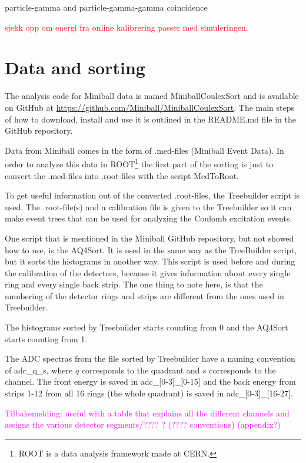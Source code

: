 \documentclass[twoside,english]{uiofysmaster/uiofysmaster}
\begin{document}
\bigskip

particle-gamma and particle-gamma-gamma coincidence

\textcolor{red}{sjekk opp om energi fra online kalibrering passer med simuleringen.}

\section{Data and sorting}
The analysis code for Miniball data is named MiniballCoulexSort and is available on GitHub at \url{https://github.com/Miniball/MiniballCoulexSort}. 
The main steps of how to download, install and use it is outlined in the README.md file in the GitHub repository. 

Data from Miniball comes in the form of .med-files (Miniball Event Data). 
In order to analyze this data in ROOT\footnote{ROOT is a data analysis framework made at CERN.} the first part of the sorting is just to convert the .med-files into .root-files with the script MedToRoot. 

To get useful information out of the converted .root-files, the Treebuilder script is used. 
The .root-file(s) and a calibration file is given to the Treebuilder so it can make event trees that can be used for analyzing the Coulomb excitation events. 

One script that is mentioned in the Miniball GitHub repository, but not showed how to use, is the AQ4Sort. It is used in the same way as the TreeBuilder script, but it sorts the histograms in another way. 
This script is used before and during the calibration of the detectors, because it gives information about every single ring and every single back strip. The one thing to note here, is that the numbering of the detector rings and strips are different from the ones used in Treebuilder. 


The histograms sorted by Treebuilder starts counting from 0 and the AQ4Sort starts counting from 1. 

The ADC spectras from the file sorted by Treebuilder have a naming convention of adc\_q\_s, where $q$ corresponds to the quadrant and $s$ corresponds to the channel. The front energy is saved in adc\_[0-3]\_[0-15] and the back energy from strips 1-12 from all 16 rings (the whole quadrant) is saved in adc\_[0-3]\_[16-27].

\textcolor{Magenta}{Tilbakemelding: \newline 
useful with a table that explains all the different channels and assigns the various detector segments/???? ? (???? conventions) (appendix?)
}
\end{document}
